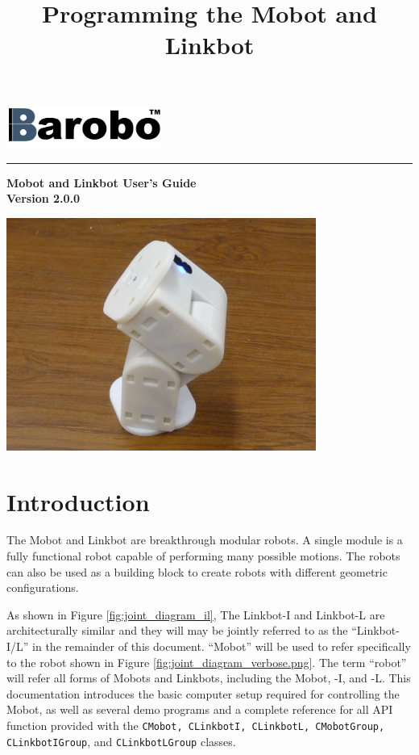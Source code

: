 \documentclass{article}
\title{Programming the Mobot and Linkbot}
\begin{document}
\includegraphics[width=2in]{images/Barobo.png}
\hrule
\begin{center}
\vspace*{2.5cm}
{\Huge\sf\bf Mobot and Linkbot User's Guide}\\
\vspace*{2.5cm}
{\Large\bf Version 2.0.0}
\vspace{4.5cm}

\includegraphics[width=4in]{images/Mobot_Camera_Stand.JPG}
\end{center}


\newpage
\tableofcontents
\newpage
\section{Introduction}
The Mobot and Linkbot are breakthrough modular robots. A single module is a fully 
functional robot capable of performing many possible motions. The robots
can also be used as a building block to create robots with different
geometric configurations. 

As shown in Figure \ref{fig:joint_diagram_il}, 
The Linkbot-I and Linkbot-L are architecturally similar and they will may 
be jointly referred to as the ``Linkbot-I/L'' in the remainder of this document. 
``Mobot'' will be used to refer specifically to the robot shown in
Figure \ref{fig:joint_diagram_verbose.png}. The term ``robot'' will refer all
forms of Mobots and Linkbots, including the Mobot, -I, and -L. 
This documentation introduces the basic computer setup required for controlling 
the Mobot, as well as several demo programs and a complete reference for all
API function provided with the \texttt{CMobot, CLinkbotI, CLinkbotL, CMobotGroup,
  CLinkbotIGroup}, and \texttt{CLinkbotLGroup} classes.
\end{document}
